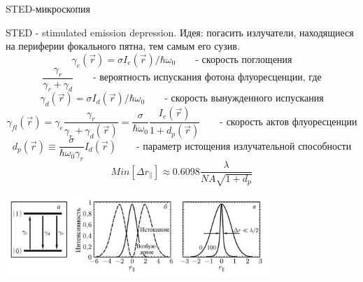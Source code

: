 \documentclass[9pt, compress, xcolor=table]{beamer}
\begin{document}
\begin{frame}{STED-микроскопия}

STED - stimulated emission depression. Идея: погасить излучатели, находящиеся на периферии фокального пятна, тем самым его сузив.
\begin{equation*}
\gamma_e (\vec r) = \sigma I_e(\vec r) / \hbar \omega_0\qquad\text{- скорость поглощения}
\end{equation*}
\begin{equation*}
\frac{\gamma_r}{\gamma_r + \gamma_d}\qquad\text{- вероятность испускания фотона флуоресценции, где}
\end{equation*}
\begin{equation*}
\gamma_d (\vec r) = \sigma I_d(\vec r) / \hbar \omega_0\qquad\text{- скорость вынужденного испускания}
\end{equation*}
\begin{equation*}
\gamma_{fl} (\vec r) = \gamma_e \frac{\gamma_r}{\gamma_r + \gamma_d (\vec r)} = \frac{\sigma}{\hbar \omega_0}
\frac{I_e (\vec r)}{1 + d_p (\vec r)}\qquad\text{- скорость актов флуоресценции}
\end{equation*}
\begin{equation*}
d_p(\vec r) \equiv \frac{\sigma}{\hbar \omega_0 \gamma_r} I_d(\vec r)\qquad\text{- параметр истощения излучательной способности}
\end{equation*}
\begin{equation*}
\boxed{Min[\Delta r_{||}] \approx 0.6098 \frac{\lambda}{NA \sqrt{1 + d_p}}}
\end{equation*}
\begin{center}
\includegraphics[width=10cm]{fig4_07f}
\end{center}

\end{frame}
\end{document}
